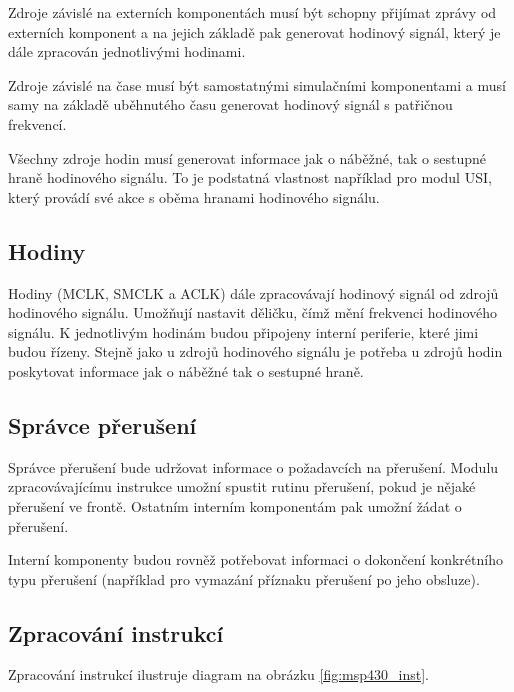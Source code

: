 Zdroje závislé na externích komponentách musí být schopny přijímat zprávy od externích komponent a na jejich základě pak generovat hodinový signál, který je dále zpracován jednotlivými hodinami.

Zdroje závislé na čase musí být samostatnými simulačními komponentami a musí samy na základě uběhnutého času generovat hodinový signál s patřičnou frekvencí.

Všechny zdroje hodin musí generovat informace jak o náběžné, tak o sestupné hraně hodinového signálu. To je podstatná vlastnost například pro modul USI, který provádí své akce s oběma hranami hodinového signálu.

\subsection{Hodiny}

Hodiny (MCLK, SMCLK a ACLK) dále zpracovávají hodinový signál od zdrojů hodinového signálu. Umožňují nastavit děličku, čímž mění frekvenci hodinového signálu. K jednotlivým hodinám budou připojeny interní periferie, které jimi budou řízeny. Stejně jako u zdrojů hodinového signálu je potřeba u zdrojů hodin poskytovat informace jak o náběžné tak o sestupné hraně.

\subsection{Správce přerušení}

Správce přerušení bude udržovat informace o požadavcích na přerušení. Modulu zpracovávajícímu instrukce umožní spustit rutinu přerušení, pokud je nějaké
přerušení ve frontě. Ostatním interním komponentám pak umožní žádat o přerušení.

Interní komponenty budou rovněž potřebovat informaci o dokončení konkrétního typu přerušení (například pro vymazání příznaku přerušení po jeho obsluze).

\subsection{Zpracování instrukcí}

Zpracování instrukcí ilustruje diagram na obrázku \ref{fig:msp430_inst}.

